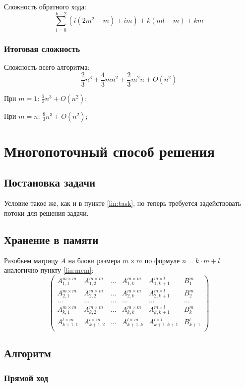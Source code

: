 \documentclass[12pt]{report}
\begin{document}
        Сложность обратного хода:
        \[ \sum^{k-2}_{i=0} (i(2m^2-m) + im) + k(ml - m) + km \]

        \subsection{Итоговая сложность}
        Сложность всего алгоритма: 
        \[\boxed{\frac{2}{3}n^3 + \frac{4}{3}mn^2 + \frac{2}{3}m^2n + O(n^2)} \]

        При $m = 1$: $\frac{2}{3}n^3 + O(n^2)$;

        При $m = n$: $\frac{8}{3}n^3 + O(n^2)$;
    
    \chapter{Многопоточный способ решения}
        \section{Постановка задачи} \label{thread:task}
        Условие такое же, как и в пункте \ref{lin:task}, но теперь требуется задействовать 
        потоки для решения задачи. 

        
        \section{Хранение в памяти} \label{thread:mem}
        \quad Разобьем матрицу $A$ на блоки размера $m \times m$ 
        по формуле $ n = k \cdot m + l $ аналогично пункту \ref{lin:mem}:
        \[
        \left(
        \begin{array}{ccccc|c}
            A_{1,1}^{m \times m}   & A_{1,2}^{m \times m}   & \ldots & A_{1,k}^{m \times m}   & A_{1,k+1}^{m \times l}    & B^{m}_{1}   \\
            A_{2,1}^{m \times m}   & A_{2,2}^{m \times m}   & \ldots & A_{2,k}^{m \times m}   & A_{2,k+1}^{m \times l}    & B^{m}_{2}   \\
            \ldots                 & \ldots                 & \ldots & \ldots                 & \ldots                    & \ldots      \\
            A_{k,1}^{m \times m}   & A_{k,2}^{m \times m}   & \ldots & A_{k,k}^{m \times m}   & A_{k,k+1}^{m \times l}    & B^{m}_{k}   \\
            A_{k+1,1}^{l \times m} & A_{k+1,2}^{l \times m} & \ldots & A_{k+1,k}^{l \times m} & A_{k+1, k+1}^{l \times l} & B^{l}_{k+1} \\
        \end{array}
        \right)
        \]
        \section{Алгоритм} \label{thread:alg}
        \subsection{Прямой ход}
\end{document}

